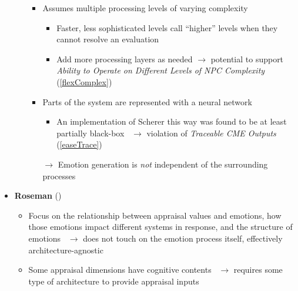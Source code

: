\begin{itemize}
\begin{itemize}
\begin{itemize}
            \item Assumes multiple processing levels of varying
            complexity~\citep[p.~103]{scherer2001appraisalB}
            \begin{itemize}
                \item Faster, less sophisticated levels call ``higher'' levels
                when they cannot resolve an evaluation

                \item Add more processing layers as needed $\rightarrow$
                potential to support \textit{Ability to Operate on Different
                    Levels of NPC Complexity} (\ref{flexComplex})
            \end{itemize}

            \item Parts of the system are represented with a neural
            network~\citep[p.~105]{scherer2001appraisalB}
            \begin{itemize}
                \item An implementation of Scherer this way was found to be at
                least partially
                black-box~\citep[p.~143--144]{meuleman2015computational}
                $\rightarrow$ violation of \textit{Traceable CME Outputs}
                (\ref{easeTrace})
            \end{itemize}

            \item [$\rightarrow$] Emotion generation is \textit{not}
            independent of the surrounding processes
        \end{itemize}
    \end{itemize}

    \item \textbf{Roseman} (\good)
    \begin{itemize}
        \item Focus on the relationship between appraisal values and emotions,
        how those emotions impact different systems in response, and the
        structure of emotions~\citep[p.~68, 81]{roseman2001model} $\rightarrow$
        does not touch on the emotion process itself, effectively
        architecture-agnostic

        \item Some appraisal dimensions have cognitive
        contents~\citep[p.~265]{roseman1996appraisal} $\rightarrow$ requires
        some type of architecture to provide appraisal inputs
    \end{itemize}


\end{itemize}
